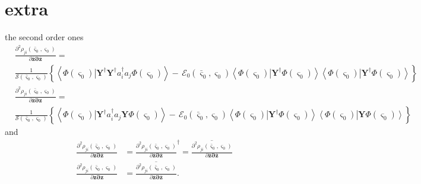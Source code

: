 \documentclass[aps,preprint]{revtex4}%
\begin{document}
\section{extra}

the second order ones
\begin{align}
& \frac{\partial^{2}\rho_{ji}\left(  \mathbf{\bar{\varsigma}}_{0}%
,\mathbf{\varsigma}_{0}\right)  }{\partial\mathbf{\bar{z}\partial\bar{z}}%
}=\nonumber\\
& \frac{1}{\mathcal{S}\left(  \mathbf{\bar{\varsigma}}_{0},\mathbf{\varsigma
}_{0}\right)  }\left\{  \left\langle \left.  \Phi\left(  \mathbf{\varsigma
}_{0}\right)  \right\vert \mathbf{Y}^{\dagger}\mathbf{Y}^{\dagger}%
a_{i}^{\dagger}a_{j}\Phi\left(  \mathbf{\varsigma}_{0}\right)  \right\rangle
-\,\mathcal{E}_{0}\left(  \mathbf{\bar{\varsigma}}_{0},\mathbf{\varsigma}%
_{0}\right)  \left\langle \left.  \Phi\left(  \mathbf{\varsigma}_{0}\right)
\right\vert \mathbf{Y}^{\dagger}\Phi\left(  \mathbf{\varsigma}_{0}\right)
\right\rangle \left\langle \left.  \Phi\left(  \mathbf{\varsigma}_{0}\right)
\right\vert \mathbf{Y}^{\dagger}\Phi\left(  \mathbf{\varsigma}_{0}\right)
\right\rangle \right\}  \nonumber\\
& \frac{\partial^{2}\rho_{ji}\left(  \mathbf{\bar{\varsigma}}_{0}%
,\mathbf{\varsigma}_{0}\right)  }{\partial\mathbf{\bar{z}\partial z}%
}=\nonumber\\
& \frac{1}{\mathcal{S}\left(  \mathbf{\bar{\varsigma}}_{0},\mathbf{\varsigma
}_{0}\right)  }\left\{  \left\langle \left.  \Phi\left(  \mathbf{\varsigma
}_{0}\right)  \right\vert \mathbf{Y}^{\dagger}a_{i}^{\dagger}a_{j}%
\mathbf{Y}\Phi\left(  \mathbf{\varsigma}_{0}\right)  \right\rangle
-\,\mathcal{E}_{0}\left(  \mathbf{\bar{\varsigma}}_{0},\mathbf{\varsigma}%
_{0}\right)  \left\langle \left.  \Phi\left(  \mathbf{\varsigma}_{0}\right)
\right\vert \mathbf{Y}^{\dagger}\Phi\left(  \mathbf{\varsigma}_{0}\right)
\right\rangle \left\langle \left.  \Phi\left(  \mathbf{\varsigma}_{0}\right)
\right\vert \mathbf{Y}\Phi\left(  \mathbf{\varsigma}_{0}\right)  \right\rangle
\right\}
\end{align}
and
\begin{align}
\frac{\partial^{2}\rho_{ji}\left(  \mathbf{\bar{\varsigma}}_{0}%
,\mathbf{\varsigma}_{0}\right)  }{\partial\mathbf{z\partial\bar{z}}}  &
=\frac{\partial^{2}\rho_{ji}\left(  \mathbf{\bar{\varsigma}}_{0}%
,\mathbf{\varsigma}_{0}\right)  }{\partial\mathbf{\bar{z}\partial\bar{z}}%
}^{\dagger}=\overline{\frac{\partial^{2}\rho_{ji}\left(  \mathbf{\bar
{\varsigma}}_{0},\mathbf{\varsigma}_{0}\right)  }{\partial\mathbf{\bar
{z}\partial\bar{z}}}}\nonumber\\
\frac{\partial^{2}\rho_{ji}\left(  \mathbf{\bar{\varsigma}}_{0}%
,\mathbf{\varsigma}_{0}\right)  }{\partial\mathbf{z\partial z}}  &
=\overline{\frac{\partial^{2}\rho_{ji}\left(  \mathbf{\bar{\varsigma}}%
_{0},\mathbf{\varsigma}_{0}\right)  }{\partial\mathbf{\bar{z}\partial\bar{z}}%
}}.
\end{align}
\end{document}
